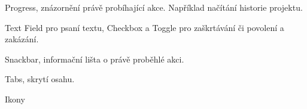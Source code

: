 \FloatBarrier

Progress, znázornění právě probíhající akce. Například načítání historie projektu.

Text Field pro psaní textu, Checkbox a Toggle pro zaškrtávání či povolení a zakázání.

Snackbar, informační lišta o právě proběhlé akci.

Tabs, skrytí osahu.

Ikony

